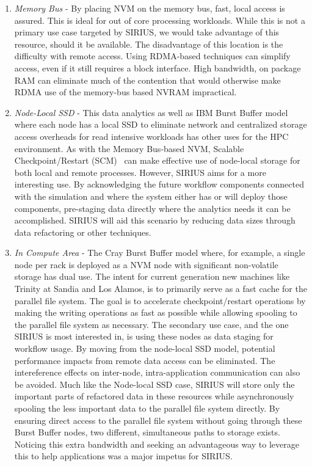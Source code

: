 \begin{enumerate}

\item {\em Memory Bus} - By placing NVM on the memory bus, fast, local access
is assured. This is ideal for out of core processing workloads. While this is
not a primary use case targeted by SIRIUS, we would take advantage of this
resource, should it be available. The disadvantage of this location is the
difficulty with remote access. Using RDMA-based techniques can simplify
access, even if it still requires a block interface. High bandwidth, on package
RAM can eliminate much of the contention that would otherwise make RDMA use of
the memory-bus based NVRAM impractical.

\item {\em Node-Local SSD} - This data analytics as well as IBM Burst Buffer
model where each node has a local SSD to eliminate network and centralized
storage access overheads for read intensive workloads has other uses for the
HPC environment. As with the Memory Bus-based NVM, Scalable Checkpoint/Restart
(SCM)~\cite{moody:2010:scr} can make effective use of node-local storage for
both local and remote processes. However, SIRIUS aims for a more interesting
use. By acknowledging the future workflow components connected with the
simulation and where the system either has or will deploy those components,
pre-staging data directly where the analytics needs it can be accomplished.
SIRIUS will aid this scenario by reducing data sizes through data refactoring
or other techniques.

\item {\em In Compute Area} - The Cray Burst Buffer model where, for example,
a single node per rack is deployed as a NVM node with significant non-volatile
storage has dual use. The intent for current generation new machines like
Trinity at Sandia and Los Alamos, is to primarily serve as a fast cache for the
parallel file system. The goal is to accelerate checkpoint/restart operations
by making the writing operations as fast as possible while allowing spooling to
the parallel file system as necessary. The secondary use case, and the one
SIRIUS is most interested in, is using these nodes as data staging for workflow
usage. By moving from the node-local SSD model, potential performance impacts
from remote data access can be eliminated. The intereference effects on
inter-node, intra-application communication can also be avoided. Much like the
Node-local SSD case, SIRIUS will store only the important parts of refactored
data in these resources while asynchronously spooling the less important data
to the parallel file system directly. By ensuring direct access to the parallel
file system without going through these Burst Buffer nodes, two different,
simultaneous paths to storage exists. Noticing this extra bandwidth and seeking
an advantageous way to leverage this to help applications was a major impetus
for SIRIUS.


\end{enumerate}
